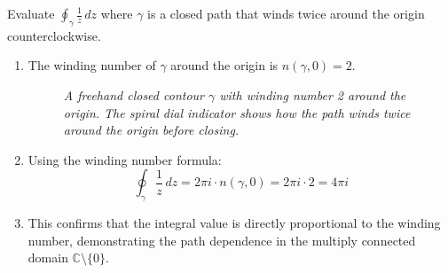 \exampleline
\begin{example}
Evaluate $\oint_{\gamma} \frac{1}{z}\,dz$ where $\gamma$ is a closed path that winds twice around the origin counterclockwise.

\begin{solution}
\begin{enumerate}
\item The winding number of $\gamma$ around the origin is $n(\gamma,0) = 2$.

   \begin{figure}[H]
   \centering
   \caption{\textit{A freehand closed contour $\gamma$ with winding number 2 around the origin. The spiral dial indicator shows how the path winds twice around the origin before closing.}}
   \label{fig:double-winding}
   \end{figure}

\item Using the winding number formula:
   \[
   \oint_{\gamma} \frac{1}{z}\,dz = 2\pi i \cdot n(\gamma,0) = 2\pi i \cdot 2 = 4\pi i
   \]

\item This confirms that the integral value is directly proportional to the winding number, demonstrating the path dependence in the multiply connected domain $\mathbb{C} \setminus \{0\}$.
\end{enumerate}
\end{solution}
\end{example}
\exampleline

